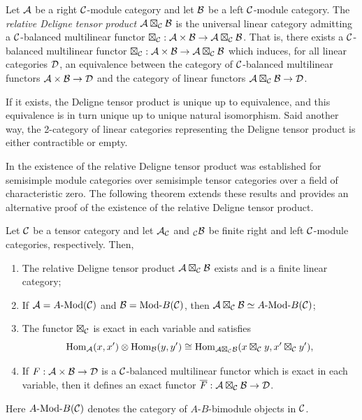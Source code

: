 \documentclass{amsart}
\begin{document}
\begin{definition}
	Let $\mathcal A$ be a right $\mathcal C$-module category and let $\mathcal B$ be a left $\mathcal C$-module category. The {\em relative Deligne tensor product $\mathcal A \boxtimes_{\mathcal C} \mathcal B$} is the universal linear category admitting a $\mathcal C$-balanced multilinear functor $\boxtimes_{\mathcal C}: \mathcal A \times \mathcal B \to \mathcal A \boxtimes_{\mathcal C} \mathcal B$. That is, there exists a $\mathcal C$-balanced multilinear functor $\boxtimes_{\mathcal C}: \mathcal A \times \mathcal B \to \mathcal A \boxtimes_{\mathcal C} \mathcal B$ which induces, for all linear categories $\mathcal D$, an equivalence between the category of $\mathcal C$-balanced multilinear functors $\mathcal A \times \mathcal B \to \mathcal D$ and the category of linear functors $\mathcal A \boxtimes_{\mathcal C} \mathcal B \to \mathcal D$. 
\end{definition}

If it exists, the Deligne tensor product is unique up to equivalence, and this equivalence is in turn unique up to unique natural isomorphism. Said another way, the 2-category of linear categories representing the Deligne tensor product is either contractible or empty. 

In \cite{0909.3140} the existence of the relative Deligne tensor product was established for semisimple module categories over semisimple tensor categories over a field of characteristic zero. The following theorem extends these results and provides an alternative proof of the existence of the relative Deligne tensor product.   

\begin{theorem} \label{thm:DelignePrdtOverATCExists}
	Let $\mathcal C$ be a tensor category and let $\mathcal A_{\mathcal C}$ and ${}_{\mathcal C}\mathcal B$ be finite right and left $\mathcal C$-module categories, respectively. Then,
	\begin{enumerate}
		\item The relative Deligne tensor product $\mathcal A \boxtimes_{\mathcal C} \mathcal B$ exists and is a finite linear category;
		\item If $\cA = \Mod{A}{}(\cC)$ and $\cB = \Mod{}{B}(\cC)$, then $\cA \boxtimes_{\cC} \cB \simeq \Mod{A }{B}(\cC)$;

		\item The functor $\boxtimes_{\mathcal C}$ is exact in each variable and satisfies 
		\begin{equation*}
			\operatorname{Hom}_{\mathcal A}(x,x') \otimes \operatorname{Hom}_{\mathcal B}(y, y') \cong \operatorname{Hom}_{\mathcal A \boxtimes_{\mathcal C} \mathcal B} (x \boxtimes_{\mathcal C} y, x' \boxtimes_{\mathcal C} y'),
		\end{equation*}
		\item If $F: \mathcal A \times \mathcal B \to \mathcal D$ is a $\mathcal C$-balanced multilinear functor which is exact in each variable, then it defines an exact functor $\overline{F}: \mathcal A \boxtimes_{\mathcal C} \mathcal B \to \mathcal D$. 
	\end{enumerate} 
\nid Here $\Mod{A}{B}(\cC)$ denotes the category of $A$-$B$-bimodule objects in $\mathcal C$.	
\end{theorem}
\end{document}
